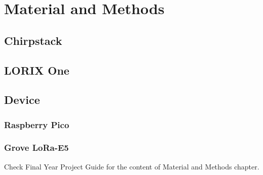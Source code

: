 
\chapter{Material and Methods}
\section{Chirpstack}
\section{LORIX One}
\section{Device}
\subsection{Raspberry Pico}
\subsection{Grove LoRa-E5}

Check Final Year Project Guide for the content of Material and Methods chapter.

\clearpage %

